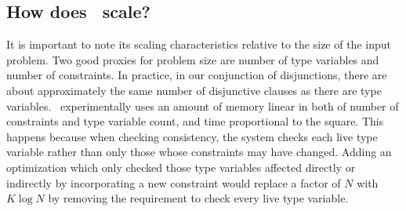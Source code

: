 \subsection{How does \bitr\ scale?}
\label{subsec:speed}
It is important to note its scaling characteristics relative to the size of the input problem. Two good proxies for problem size are number of type variables and number of constraints. In practice, in our conjunction of disjunctions, there are about approximately the same number of disjunctive clauses as there are type variables. \bitr\ experimentally uses an amount of memory linear in both of number of constraints and type variable count, and time proportional to the square. This happens because when checking consistency, the system checks each live type variable rather than only those whose constraints may have changed. Adding an optimization which only checked those type variables affected directly or indirectly by incorporating a new constraint would replace a factor of $N$ with $K \log N$ by removing the requirement to check every live type variable.
